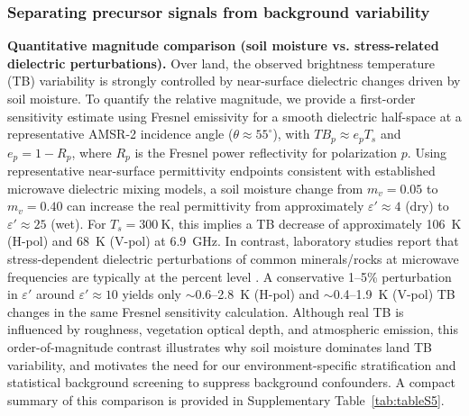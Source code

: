 \documentclass[preprint,review,12pt,authoryear]{elsarticle}
\begin{document}
\subsubsection{Separating precursor signals from background variability}
\textbf{Quantitative magnitude comparison (soil moisture vs. stress-related dielectric perturbations).} Over land, the observed brightness temperature (TB) variability is strongly controlled by near-surface dielectric changes driven by soil moisture. To quantify the relative magnitude, we provide a first-order sensitivity estimate using Fresnel emissivity for a smooth dielectric half-space at a representative AMSR-2 incidence angle ($\theta \approx 55^{\circ}$), with $TB_p \approx e_p T_s$ and $e_p = 1 - R_p$, where $R_p$ is the Fresnel power reflectivity for polarization $p$. Using representative near-surface permittivity endpoints consistent with established microwave dielectric mixing models, a soil moisture change from $m_v = 0.05$ to $m_v = 0.40$ can increase the real permittivity from approximately $\varepsilon' \approx 4$ (dry) to $\varepsilon' \approx 25$ (wet). For $T_s = 300~\mathrm{K}$, this implies a TB decrease of approximately 106~K (H-pol) and 68~K (V-pol) at 6.9~GHz. In contrast, laboratory studies report that stress-dependent dielectric perturbations of common minerals/rocks at microwave frequencies are typically at the percent level \citep{maoImpactCompressiveStress2020}. A conservative 1--5\% perturbation in $\varepsilon'$ around $\varepsilon' \approx 10$ yields only $\sim$0.6--2.8~K (H-pol) and $\sim$0.4--1.9~K (V-pol) TB changes in the same Fresnel sensitivity calculation. Although real TB is influenced by roughness, vegetation optical depth, and atmospheric emission, this order-of-magnitude contrast illustrates why soil moisture dominates land TB variability, and motivates the need for our environment-specific stratification and statistical background screening to suppress background confounders. A compact summary of this comparison is provided in Supplementary Table~\ref{tab:tableS5}.
\end{document}
